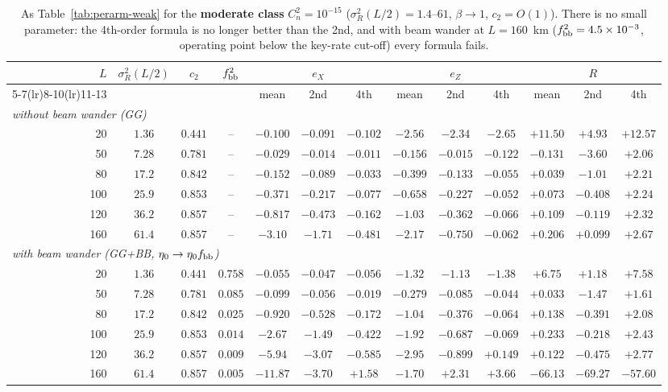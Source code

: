 \documentclass[11pt,a4paper]{article}
\theoremstyle{plain}
\theoremstyle{remark}
\begin{document}
\begin{table}[htbp]
\centering\scriptsize
\caption{As Table~\ref{tab:perarm-weak} for the \textbf{moderate class} $C_n^2=10^{-15}$ ($\sigma_R^2(L/2)=1.4$--$61$, $\beta\to1$, $c_2=O(1)$). There is no small parameter: the 4th-order formula is no longer better than the 2nd, and with beam wander at $L=160$~km ($f_{\rm bb}^2=4.5\times10^{-3}$, operating point below the key-rate cut-off) every formula fails.}
\label{tab:perarm-mod}
\begin{tabular}{rcccccccccccc}
\toprule
$L$ & $\sigma_R^2(L/2)$ & $c_2$ & $f_{\rm bb}^2$ & \multicolumn{3}{c}{$e_X$} & \multicolumn{3}{c}{$e_Z$} & \multicolumn{3}{c}{$R$}\\
\cmidrule(lr){5-7}\cmidrule(lr){8-10}\cmidrule(lr){11-13}
 & & & & mean & 2nd & 4th & mean & 2nd & 4th & mean & 2nd & 4th\\
\midrule
\multicolumn{13}{l}{\emph{without beam wander (GG)}} \\
20 & $1.36$ & $0.441$ & -- & $-0.100$ & $-0.091$ & $-0.102$ & $-2.56$ & $-2.34$ & $-2.65$ & $+11.50$ & $+4.93$ & $+12.57$ \\
50 & $7.28$ & $0.781$ & -- & $-0.029$ & $-0.014$ & $-0.011$ & $-0.156$ & $-0.015$ & $-0.122$ & $-0.131$ & $-3.60$ & $+2.06$ \\
80 & $17.2$ & $0.842$ & -- & $-0.152$ & $-0.089$ & $-0.033$ & $-0.399$ & $-0.133$ & $-0.055$ & $+0.039$ & $-1.01$ & $+2.21$ \\
100 & $25.9$ & $0.853$ & -- & $-0.371$ & $-0.217$ & $-0.077$ & $-0.658$ & $-0.227$ & $-0.052$ & $+0.073$ & $-0.408$ & $+2.24$ \\
120 & $36.2$ & $0.857$ & -- & $-0.817$ & $-0.473$ & $-0.162$ & $-1.03$ & $-0.362$ & $-0.066$ & $+0.109$ & $-0.119$ & $+2.32$ \\
160 & $61.4$ & $0.857$ & -- & $-3.10$ & $-1.71$ & $-0.481$ & $-2.17$ & $-0.750$ & $-0.062$ & $+0.206$ & $+0.099$ & $+2.67$ \\
\midrule
\multicolumn{13}{l}{\emph{with beam wander (GG+BB, $\eta_0\to\eta_0f_{\rm bb}$)}} \\
20 & $1.36$ & $0.441$ & $0.758$ & $-0.055$ & $-0.047$ & $-0.056$ & $-1.32$ & $-1.13$ & $-1.38$ & $+6.75$ & $+1.18$ & $+7.58$ \\
50 & $7.28$ & $0.781$ & $0.085$ & $-0.099$ & $-0.056$ & $-0.019$ & $-0.279$ & $-0.085$ & $-0.044$ & $+0.033$ & $-1.47$ & $+1.61$ \\
80 & $17.2$ & $0.842$ & $0.025$ & $-0.920$ & $-0.528$ & $-0.172$ & $-1.04$ & $-0.376$ & $-0.064$ & $+0.138$ & $-0.391$ & $+2.08$ \\
100 & $25.9$ & $0.853$ & $0.014$ & $-2.67$ & $-1.49$ & $-0.422$ & $-1.92$ & $-0.687$ & $-0.069$ & $+0.233$ & $-0.218$ & $+2.43$ \\
120 & $36.2$ & $0.857$ & $0.009$ & $-5.94$ & $-3.07$ & $-0.585$ & $-2.95$ & $-0.899$ & $+0.149$ & $+0.122$ & $-0.475$ & $+2.77$ \\
160 & $61.4$ & $0.857$ & $0.005$ & $-11.87$ & $-3.70$ & $+1.58$ & $-1.70$ & $+2.31$ & $+3.66$ & $-66.13$ & $-69.27$ & $-57.60$ \\


\end{tabular}
\end{table}
\end{document}
